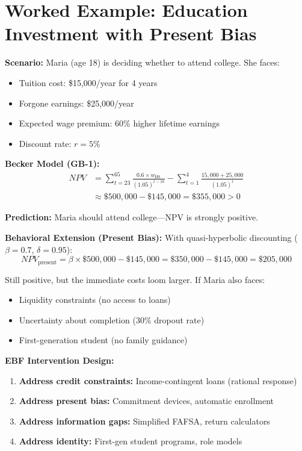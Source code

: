 \section{Worked Example: Education Investment with Present Bias}
\label{sec:gb-example}

\begin{tcolorbox}[colback=yellow!5!white,colframe=yellow!75!black,title=Worked Example: College Enrollment Decision]
\textbf{Scenario:} Maria (age 18) is deciding whether to attend college. She faces:
\begin{itemize}
    \item Tuition cost: \$15,000/year for 4 years
    \item Forgone earnings: \$25,000/year
    \item Expected wage premium: 60\% higher lifetime earnings
    \item Discount rate: $r = 5\%$
\end{itemize}

\textbf{Becker Model (GB-1):}
\begin{align}
NPV &= \sum_{t=23}^{65} \frac{0.6 \times w_{\text{HS}}}{(1.05)^{t-18}} - \sum_{t=1}^{4} \frac{15,000 + 25,000}{(1.05)^t} \\
&\approx \$500,000 - \$145,000 = \$355,000 > 0
\end{align}

\textbf{Prediction:} Maria should attend college---NPV is strongly positive.

\textbf{Behavioral Extension (Present Bias):}
With quasi-hyperbolic discounting ($\beta = 0.7$, $\delta = 0.95$):
\begin{equation}
NPV_{\text{present}} = \beta \times \$500,000 - \$145,000 = \$350,000 - \$145,000 = \$205,000
\end{equation}

Still positive, but the immediate costs loom larger. If Maria also faces:
\begin{itemize}
    \item Liquidity constraints (no access to loans)
    \item Uncertainty about completion (30\% dropout rate)
    \item First-generation student (no family guidance)
\end{itemize}

\textbf{EBF Intervention Design:}
\begin{enumerate}
    \item \textbf{Address credit constraints:} Income-contingent loans (rational response)
    \item \textbf{Address present bias:} Commitment devices, automatic enrollment
    \item \textbf{Address information gaps:} Simplified FAFSA, return calculators
    \item \textbf{Address identity:} First-gen student programs, role models
\end{enumerate}


\end{tcolorbox}

